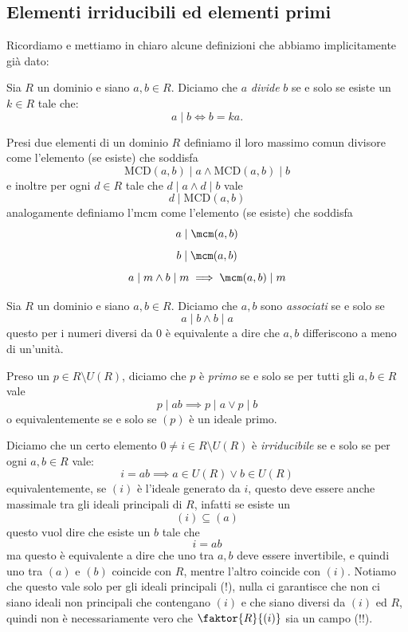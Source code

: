\documentclass[11pt]{scrartcl}
\newcommand{\MCD}{\text{MCD}}
\begin{document}
	\subsection{Elementi irriducibili ed elementi primi}
	Ricordiamo e mettiamo in chiaro alcune definizioni che abbiamo implicitamente già dato:
	\begin{definition}[Divisibilità]
		Sia $R$ un dominio e siano $a,b\in R$. Diciamo che $a$ \textit{divide} $b$ se e solo se esiste un $k\in R$ tale che:
		$$a\mid b \iff b=ka.$$
	\end{definition}
	\begin{definition}
		Presi due elementi di un dominio $R$ definiamo il loro massimo comun divisore come l'elemento (se esiste) che soddisfa
		$$\MCD(a,b)\mid a \land \MCD(a,b)\mid b$$
		e inoltre per ogni $d\in R$ tale che $d\mid a\land d\mid b$ vale
		$$d\mid \MCD(a,b)$$
		analogamente definiamo l'mcm come l'elemento (se esiste) che soddisfa
		$$a\mid \mcm(a,b)$$
		$$b\mid \mcm(a,b)$$
		$$a\mid m \land b\mid m \implies \mcm(a,b)\mid m$$
	\end{definition}
	\begin{definition}
		Sia $R$ un dominio e siano $a,b\in R$. Diciamo che $a,b$ sono \textit{associati} se e solo se 
		$$a\mid b \land b \mid a$$
		questo per i numeri diversi da $0$ è equivalente a dire che $a,b$ differiscono a meno di un'unità.
	\end{definition}
	\begin{definition}
		Preso un $p\in R\setminus U(R)$, diciamo che $p$ è \textit{primo} se e solo se per tutti gli $a,b\in R$ vale 
		$$p\mid ab \implies p\mid a \lor p\mid b$$
		o equivalentemente se e solo se $(p)$ è un ideale primo.
	\end{definition}
	\begin{definition}
		Diciamo che un certo elemento $0\ne i\in R\setminus U(R)$ è \textit{irriducibile} se e solo se per ogni $a,b\in R$ vale:
		$$i=ab \implies a\in U(R) \lor b\in U(R)$$
		equivalentemente, se $(i)$ è l'ideale generato da $i$, questo deve essere anche massimale tra gli ideali principali di $R$, infatti se esiste un 
		$$(i)\subseteq(a)$$
		questo vuol dire che esiste un $b$ tale che 
		$$i=ab$$
		ma questo è equivalente a dire che uno tra $a,b$ deve essere invertibile, e quindi uno tra $(a)$ e $(b)$ coincide con $R$, mentre l'altro coincide con $(i)$. Notiamo che questo vale solo per gli ideali principali (!), nulla ci garantisce che non ci siano ideali non principali che contengano $(i)$ e che siano diversi da $(i)$ ed $R$, quindi non è necessariamente vero che $\faktor{R}{(i)}$ sia un campo (!!).
	\end{definition}
\end{document}
